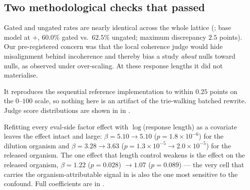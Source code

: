 \subsection{Two methodological checks that passed}
\label{sec:results-checks}

 Gated and ungated rates are nearly identical across the whole lattice (; \eg base model at \qset+\persona, $60.0\%$ gated vs.\ $62.5\%$ ungated; maximum discrepancy $2.5$ points). Our pre-registered concern was that the local coherence judge would hide misalignment behind incoherence and thereby bias a study \emph{about} nulls toward nulls, as \citet{turner2025organisms} observed under over-scaling. At these response lengths it did not materialise.

 It reproduces the sequential reference implementation to within $0.25$ points on the $0$--$100$ scale, so nothing here is an artifact of the trie-walking batched rewrite. Judge score distributions are shown in  in .

 Refitting every eval-side factor effect with $\log$(response length) as a covariate leaves the \persona effect intact and large: $\beta = 5.10 \to 5.10$ ($p=1.8\times 10^{-6}$) for the dilution organism and $\beta = 3.28 \to 3.63$ ($p=1.3\times10^{-5} \to 2.0\times10^{-5}$) for the released organism. The one effect that length control weakens is the \qset effect on the released organism, $\beta = 1.22$ ($p=0.028$) $\to 1.07$ ($p=0.089$) --- \ie the very cell that carries the organism-attributable signal in  is also the one most sensitive to the \citet{mirage2026} confound. Full coefficients are in .
